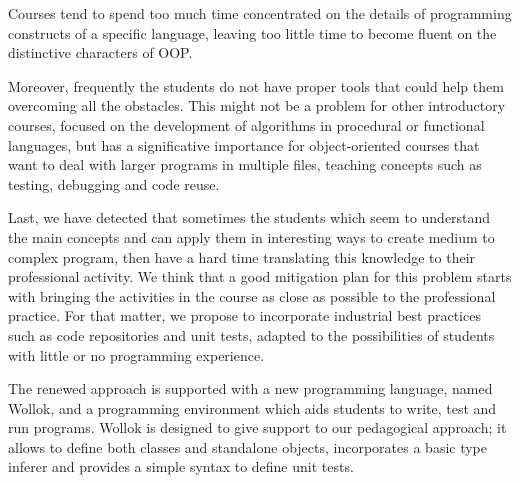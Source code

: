 
Courses tend to spend too much time concentrated on the details of programming constructs of a specific language, leaving too little time to become fluent on the distinctive characters of OOP. 

Moreover, frequently the students do not have proper tools that could help them overcoming all the obstacles.
This might not be a problem for other introductory courses, focused on the development of algorithms in procedural or functional languages, 
but has a significative importance for object-oriented courses that want to deal with larger programs in multiple files, teaching concepts such as testing, debugging and code reuse\cite{kolling_problem_1999}. 

\medskip




Last, we have detected that sometimes the students which seem to understand the main concepts and can apply them in interesting ways to create medium to complex program, 
then have a hard time translating this knowledge to their professional activity.
We think that a good mitigation plan for this problem starts with bringing the activities in the course as close as possible to the professional practice.
For that matter, we propose to incorporate industrial best practices such as code repositories and unit tests, adapted to the possibilities of students with little or no programming experience.

\medskip
The renewed approach is supported with a new programming language, named Wollok, and a programming environment which aids students to write, test and run programs.
Wollok is designed to give support to our pedagogical approach; 
it allows to define both classes and standalone objects,
incorporates a basic type inferer
and provides a simple syntax to define unit tests.

